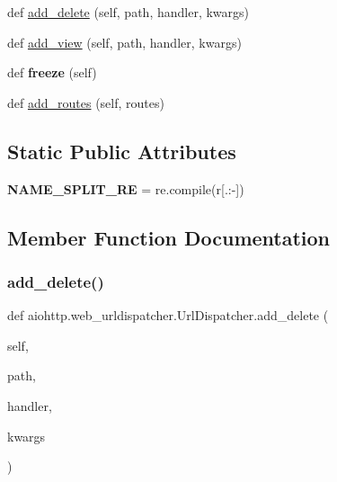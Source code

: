 \begin{DoxyCompactItemize}
def \hyperlink{classaiohttp_1_1web__urldispatcher_1_1_url_dispatcher_afda3249df3f47a4fcf13df279de849cf}{add\+\_\+delete} (self, path, handler, kwargs)
\item 
def \hyperlink{classaiohttp_1_1web__urldispatcher_1_1_url_dispatcher_a7cde1ed170743d73305dc54c19b87509}{add\+\_\+view} (self, path, handler, kwargs)
\item 
\mbox{\label{classaiohttp_1_1web__urldispatcher_1_1_url_dispatcher_aea19609481bba2157d5c7a8b7a4d96c7}} 
def {\bfseries freeze} (self)
\item 
def \hyperlink{classaiohttp_1_1web__urldispatcher_1_1_url_dispatcher_aa55ccedb52f2221f8a7b0b9bd1a6e33e}{add\+\_\+routes} (self, routes)
\end{DoxyCompactItemize}
\subsection*{Static Public Attributes}
\begin{DoxyCompactItemize}
\item 
\mbox{\label{classaiohttp_1_1web__urldispatcher_1_1_url_dispatcher_a4ae9203a668f3c22d4303efd084d3e0b}} 
{\bfseries N\+A\+M\+E\+\_\+\+S\+P\+L\+I\+T\+\_\+\+RE} = re.\+compile(r\textquotesingle{}\mbox{[}.\+:-\/\mbox{]}\textquotesingle{})
\end{DoxyCompactItemize}


\subsection{Member Function Documentation}
\mbox{\label{classaiohttp_1_1web__urldispatcher_1_1_url_dispatcher_afda3249df3f47a4fcf13df279de849cf}} 
\subsubsection{\texorpdfstring{add\+\_\+delete()}{add\_delete()}}
{\footnotesize\ttfamily def aiohttp.\+web\+\_\+urldispatcher.\+Url\+Dispatcher.\+add\+\_\+delete (\begin{DoxyParamCaption}\item[{}]{self,  }\item[{}]{path,  }\item[{}]{handler,  }\item[{}]{kwargs }\end{DoxyParamCaption})}


